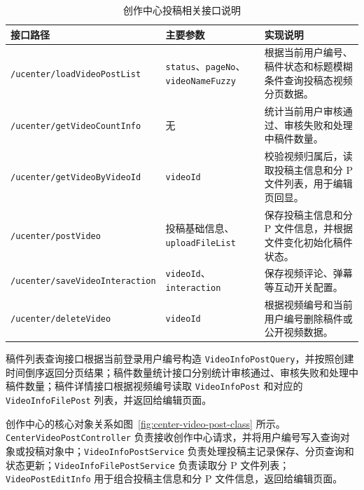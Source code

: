 \begin{table}[!htbp]
    \centering
    \caption{创作中心投稿相关接口说明}
    \label{tab:center-video-post-api}
    \begin{tabular}{p{} p{} p{}}
        \toprule
        \textbf{接口路径} & \textbf{主要参数} & \textbf{实现说明} \\
        \midrule
        \texttt{/ucenter/loadVideoPostList}
        & \texttt{status}、\texttt{pageNo}、\texttt{videoNameFuzzy}
        & 根据当前用户编号、稿件状态和标题模糊条件查询投稿态视频分页数据。 \\

        \texttt{/ucenter/getVideoCountInfo}
        & 无
        & 统计当前用户审核通过、审核失败和处理中稿件数量。 \\

        \texttt{/ucenter/getVideoByVideoId}
        & \texttt{videoId}
        & 校验视频归属后，读取投稿主信息和分 P 文件列表，用于编辑页回显。 \\

        \texttt{/ucenter/postVideo}
        & 投稿基础信息、\texttt{uploadFileList}
        & 保存投稿主信息和分 P 文件信息，并根据文件变化初始化稿件状态。 \\

        \texttt{/ucenter/saveVideoInteraction}
        & \texttt{videoId}、\texttt{interaction}
        & 保存视频评论、弹幕等互动开关配置。 \\

        \texttt{/ucenter/deleteVideo}
        & \texttt{videoId}
        & 根据视频编号和当前用户编号删除稿件或公开视频数据。 \\
        \bottomrule
    \end{tabular}
\end{table}

稿件列表查询接口根据当前登录用户编号构造 \texttt{VideoInfoPostQuery}，并按照创建时间倒序返回分页结果；稿件数量统计接口分别统计审核通过、审核失败和处理中稿件数量；稿件详情接口根据视频编号读取 \texttt{VideoInfoPost} 和对应的 \texttt{VideoInfoFilePost} 列表，并返回给编辑页面。

创作中心的核心对象关系如图~\ref{fig:center-video-post-class} 所示。\texttt{CenterVideoPostController} 负责接收创作中心请求，并将用户编号写入查询对象或投稿对象中；\texttt{VideoInfoPostService} 负责处理投稿主记录保存、分页查询和状态更新；\texttt{VideoInfoFilePostService} 负责读取分 P 文件列表；\texttt{VideoPostEditInfo} 用于组合投稿主信息和分 P 文件信息，返回给编辑页面。

